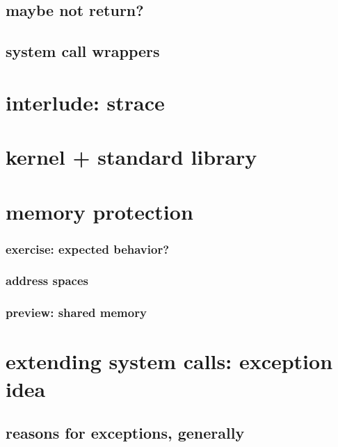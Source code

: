 \subsection{maybe not return?}


\subsection{system call wrappers}

% 

\section{interlude: strace}


\section{kernel + standard library}

\section{memory protection}

\subsubsection{exercise: expected behavior?}


\subsubsection{address spaces}


\subsubsection{preview: shared memory}


\section{extending system calls: exception idea}



\subsection{reasons for exceptions, generally}




